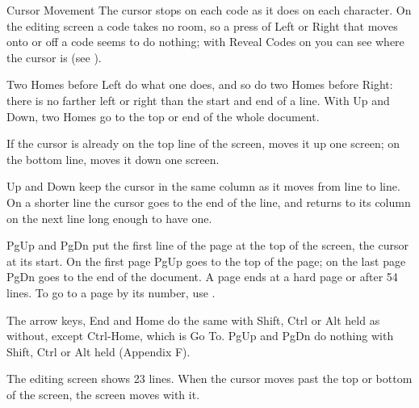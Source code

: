 \begin{Feature}{Cursor Movement}
\Notes
{}
The cursor stops on each code as it does on each character.  On the editing
screen a code takes no room, so a press of Left or Right that moves onto or
off a code seems to do nothing; with Reveal Codes on you can see where the
cursor is (see ).

Two Homes before Left do what one does, and so do two Homes before Right:
there is no farther left or right than the start and end of a line.  With Up and Down, two Homes go to the top or end of
the whole document.

If the cursor is already on the top line of the screen,  moves
it up one screen; on the bottom line,  moves it down one
screen.

Up and Down keep the cursor in the same column as it moves from line to
line.  On a shorter line the cursor goes to the end of the line, and returns
to its column on the next line long enough to have one.

PgUp and PgDn put the first line of the page at the top of the screen, the
cursor at its start.  On the first page PgUp goes to the top of the page; on
the last page PgDn goes to the end of the document.  A page ends at a hard
page or after 54 lines.  To go to a page by its number, use .

The arrow keys, End and Home do the same with Shift, Ctrl or Alt held as
without, except Ctrl-Home, which is Go To.  PgUp and PgDn do nothing with
Shift, Ctrl or Alt held (Appendix F).

The editing screen shows 23 lines.  When the cursor moves past the top or
bottom of the screen, the screen moves with it.

\end{Feature}
